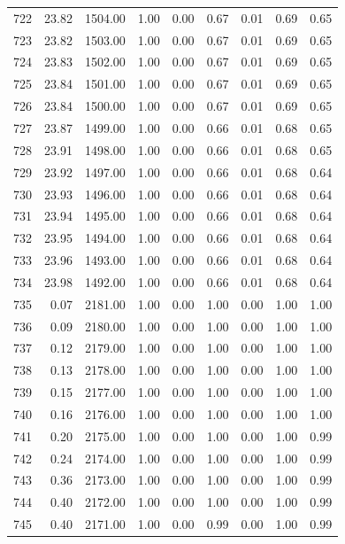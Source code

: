 \documentclass{article}\usepackage[]{graphicx}\usepackage[]{color}
\begin{document}
\begin{longtable}{rrrrrrrrr}
  722 & 23.82 & 1504.00 & 1.00 & 0.00 & 0.67 & 0.01 & 0.69 & 0.65 \\ 
  723 & 23.82 & 1503.00 & 1.00 & 0.00 & 0.67 & 0.01 & 0.69 & 0.65 \\ 
  724 & 23.83 & 1502.00 & 1.00 & 0.00 & 0.67 & 0.01 & 0.69 & 0.65 \\ 
  725 & 23.84 & 1501.00 & 1.00 & 0.00 & 0.67 & 0.01 & 0.69 & 0.65 \\ 
  726 & 23.84 & 1500.00 & 1.00 & 0.00 & 0.67 & 0.01 & 0.69 & 0.65 \\ 
  727 & 23.87 & 1499.00 & 1.00 & 0.00 & 0.66 & 0.01 & 0.68 & 0.65 \\ 
  728 & 23.91 & 1498.00 & 1.00 & 0.00 & 0.66 & 0.01 & 0.68 & 0.65 \\ 
  729 & 23.92 & 1497.00 & 1.00 & 0.00 & 0.66 & 0.01 & 0.68 & 0.64 \\ 
  730 & 23.93 & 1496.00 & 1.00 & 0.00 & 0.66 & 0.01 & 0.68 & 0.64 \\ 
  731 & 23.94 & 1495.00 & 1.00 & 0.00 & 0.66 & 0.01 & 0.68 & 0.64 \\ 
  732 & 23.95 & 1494.00 & 1.00 & 0.00 & 0.66 & 0.01 & 0.68 & 0.64 \\ 
  733 & 23.96 & 1493.00 & 1.00 & 0.00 & 0.66 & 0.01 & 0.68 & 0.64 \\ 
  734 & 23.98 & 1492.00 & 1.00 & 0.00 & 0.66 & 0.01 & 0.68 & 0.64 \\ 
  735 & 0.07 & 2181.00 & 1.00 & 0.00 & 1.00 & 0.00 & 1.00 & 1.00 \\ 
  736 & 0.09 & 2180.00 & 1.00 & 0.00 & 1.00 & 0.00 & 1.00 & 1.00 \\ 
  737 & 0.12 & 2179.00 & 1.00 & 0.00 & 1.00 & 0.00 & 1.00 & 1.00 \\ 
  738 & 0.13 & 2178.00 & 1.00 & 0.00 & 1.00 & 0.00 & 1.00 & 1.00 \\ 
  739 & 0.15 & 2177.00 & 1.00 & 0.00 & 1.00 & 0.00 & 1.00 & 1.00 \\ 
  740 & 0.16 & 2176.00 & 1.00 & 0.00 & 1.00 & 0.00 & 1.00 & 1.00 \\ 
  741 & 0.20 & 2175.00 & 1.00 & 0.00 & 1.00 & 0.00 & 1.00 & 0.99 \\ 
  742 & 0.24 & 2174.00 & 1.00 & 0.00 & 1.00 & 0.00 & 1.00 & 0.99 \\ 
  743 & 0.36 & 2173.00 & 1.00 & 0.00 & 1.00 & 0.00 & 1.00 & 0.99 \\ 
  744 & 0.40 & 2172.00 & 1.00 & 0.00 & 1.00 & 0.00 & 1.00 & 0.99 \\ 
  745 & 0.40 & 2171.00 & 1.00 & 0.00 & 0.99 & 0.00 & 1.00 & 0.99 \\ 

\end{longtable}
\end{document}
